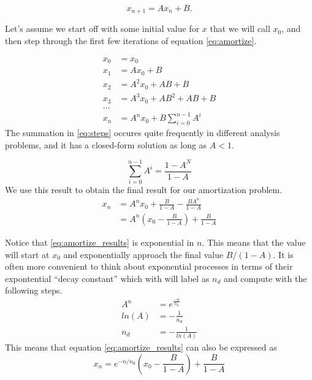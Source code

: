 \documentclass[../../main.tex]{subfiles}
\begin{document}
\begin{equation}
    \label{eq:amortize}
    x_{n+1} = A x_n + B.
\end{equation}

Let's assume we start off with some initial value for $x$ that we will call
$x_0$, and then step through the first few iterations of equation
\eqref{eq:amortize}.

\begin{align}
    \label{eq:steps}
    x_0 &= x_0\nonumber\\
    x_1 &= A x_0 + B\nonumber\\
    x_2 &= A^2 x_0 + AB + B\nonumber\\
    x_3 &= A^3 x_0 + AB^2 + AB + B\nonumber\\
    ...\nonumber\\
    x_n &=
        A^n x_0 +
        B\sum\limits_{i=0}^{n-1}A^i
\end{align}
The summation in \eqref{eq:steps} occures quite frequently in different
analysis problems, and it has a closed-form solution as long as $A < 1$.

\begin{equation}
    \label{eq:summation}
    \sum\limits_{i=0}^{n-1}A^i = \frac{1 - A ^ N}{1 - A}
\end{equation}
We use this result to obtain the final result for our amortization problem.
\begin{align}
    \label{eq:amortize_results}
    x_n &= A^n x_0 + \frac{B}{1 - A} - \frac{B A ^ n}{1 - A} \nonumber\\
        &= A^n \left( x_0 - \frac{B}{1 - A} \right) + \frac{B}{1 - A}
\end{align}

Notice that \eqref{eq:amortize_results} is exponential in $n$.  This means
that the value will start at $x_0$ and exponentially approach the final value
$B / (1-A)$.  It is often more convenient to think about exponential processes
in terms of their expontential ``decay constant'' which with will label as
$n_d$ and compute with the following steps.
\begin{align}
    \label{eq:decay}
    A^n &= e^\frac{-n}{n_d} \nonumber\\
    ln(A) &= -\frac{1}{n_d} \nonumber\\
    n_d &= -\frac{1}{ln(A)}
\end{align}
This means that equation \eqref{eq:amortize_results} can also be expressed as
\begin{equation}
    \label{eq:amortize_results_exp}
    x_n = e^{-n/n_d}
          \left( x_0 - \frac{B}{1 - A} \right) + \frac{B}{1 - A}
\end{equation}
\end{document}
